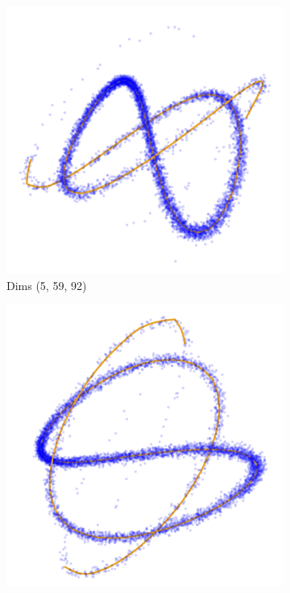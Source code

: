     \begin{figure}[htb]
        \centering
    
        \begin{subfigure}[b]{0.32\textwidth}
            \centering
            \includegraphics[width=\textwidth]{chapter5/results/visualisations/RAE/projections/sinusoid_1_100/more_transparent/5_59_92.jpg}
            \caption{Dims (5, 59, 92)}
        \end{subfigure}
        \hfill
        \begin{subfigure}[b]{0.32\textwidth}
            \centering
            \includegraphics[width=\textwidth]{chapter5/results/visualisations/RAE/projections/sinusoid_1_100/more_transparent/31_55_66.jpg}

\end{subfigure}
\end{figure}
